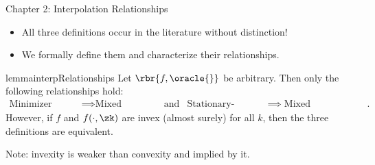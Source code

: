 \documentclass[mathserif,notheorems, hyperref={colorlinks, citecolor=blue, urlcolor=blue, linkcolor=blue}]{beamer}
\def\\{}%
\begin{document}
    \begin{frame}{Chapter 2: Interpolation Relationships}

        \begin{itemize}
            \item All three definitions occur in the literature without distinction!
            \item We formally define them and characterize their relationships. 
        \end{itemize}

        \pause

        \begin{restatable}{lemma}{interpRelationships}
            Let \( \rbr{f, \oracle{}} \) be arbitrary. 
            Then only the following relationships hold: 
            \begin{align*}
                \text{Minimizer Interpolation} &\implies \text{Mixed Interpolation} \\
                                                                                       & \text{and} &\\
                \text{Stationary-Point Interpolation} &\implies \text{Mixed Interpolation}.
            \end{align*}
            However, if \( f \) and \( f(\cdot, \zk) \) are invex (almost surely) for all \( k \), then the three definitions are equivalent. 
        \end{restatable}

        Note: invexity is weaker than convexity and implied by it. 
        
    \end{frame}
   
\end{document}
